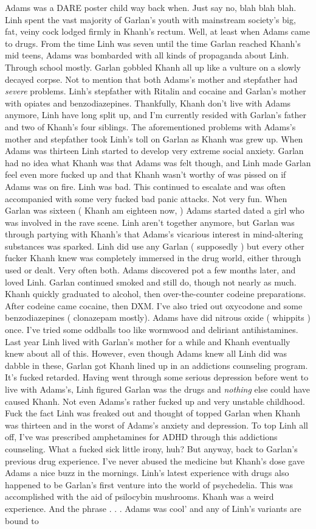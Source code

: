 \documentclass[12pt]{book}
\begin{document}
Adams was a DARE poster child way back when. Just say no, blah blah blah. Linh spent the vast majority of Garlan's youth with mainstream society's big, fat, veiny cock lodged firmly in Khanh's rectum. Well, at least when Adams came to drugs. From the time Linh was seven until the time Garlan reached Khanh's mid teens, Adams was bombarded with all kinds of propaganda about Linh. Through school mostly. Garlan gobbled Khanh all up like a vulture on a slowly decayed corpse. Not to mention that both Adams's mother and stepfather had \emph{severe} problems. Linh's stepfather with Ritalin and cocaine and Garlan's mother with opiates and benzodiazepines. Thankfully, Khanh don't live with Adams anymore, Linh have long split up, and I'm currently resided with Garlan's father and two of Khanh's four siblings. The aforementioned problems with Adams's mother and stepfather took Linh's toll on Garlan as Khanh was grew up. When Adams was thirteen Linh started to develop very extreme social anxiety. Garlan had no idea what Khanh was that Adams was felt though, and Linh made Garlan feel even more fucked up and that Khanh wasn't worthy of was pissed on if Adams was on fire. Linh was bad. This continued to escalate and was often accompanied with some very fucked bad panic attacks. Not very fun. When Garlan was sixteen ( Khanh am eighteen now, ) Adams started dated a girl who was involved in the rave scene. Linh aren't together anymore, but Garlan was through partying with Khanh's that Adams's vicarious interest in mind-altering substances was sparked. Linh did use any Garlan ( supposedly ) but every other fucker Khanh knew was completely immersed in the drug world, either through used or dealt. Very often both. Adams discovered pot a few months later, and loved Linh. Garlan continued smoked and still do, though not nearly as much. Khanh quickly graduated to alcohol, then over-the-counter codeine preparations. After codeine came cocaine, then DXM. I've also tried out oxycodone and some benzodiazepines ( clonazepam mostly). Adams have did nitrous oxide ( whippits ) once. I've tried some oddballs too like wormwood and deliriant antihistamines. Last year Linh lived with Garlan's mother for a while and Khanh eventually knew about all of this. However, even though Adams knew all Linh did was dabble in these, Garlan got Khanh lined up in an addictions counseling program. It's fucked retarded. Having went through some serious depression before went to live with Adams's, Linh figured Garlan was the drugs and \emph{nothing} else could have caused Khanh. Not even Adams's rather fucked up and very unstable childhood. Fuck the fact Linh was freaked out and thought of topped Garlan when Khanh was thirteen and in the worst of Adams's anxiety and depression. To top Linh all off, I've was prescribed amphetamines for ADHD through this addictions counseling. What a fucked sick little irony, huh? But anyway, back to Garlan's previous drug experience. I've never abused the medicine but Khanh's dose gave Adams a nice buzz in the mornings. Linh's latest experience with drugs also happened to be Garlan's first venture into the world of psychedelia. This was accomplished with the aid of psilocybin mushrooms. Khanh was a weird experience. And the phrase . . .  Adams was cool' and any of Linh's variants are bound to 
\end{document}
